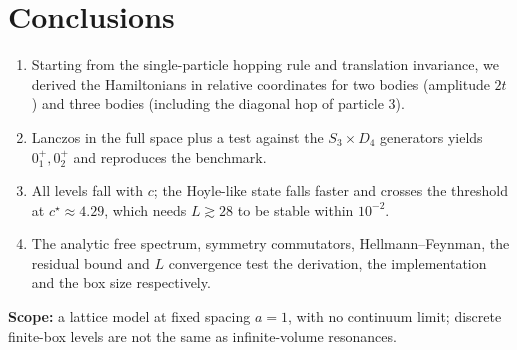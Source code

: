 \documentclass[11pt,a4paper]{article}
\begin{document}
\section{Conclusions}
\begin{enumerate}
\item Starting from the single-particle hopping rule and translation invariance, we derived the Hamiltonians in relative coordinates for two bodies (amplitude $2t$) and three bodies (including the diagonal hop of particle 3).
\item Lanczos in the full space plus a test against the $S_3\times D_4$ generators yields $0^+_1,0^+_2$ and reproduces the benchmark.
\item All levels fall with $c$; the Hoyle-like state falls faster and crosses the threshold at $c^\star\approx4.29$, which needs $L\gtrsim28$ to be stable within $10^{-2}$.
\item The analytic free spectrum, symmetry commutators, Hellmann--Feynman, the residual bound and $L$ convergence test the derivation, the implementation and the box size respectively.
\end{enumerate}
\textbf{Scope:} a lattice model at fixed spacing $a=1$, with no continuum limit; discrete finite-box levels are not the same as infinite-volume resonances.
\end{document}
